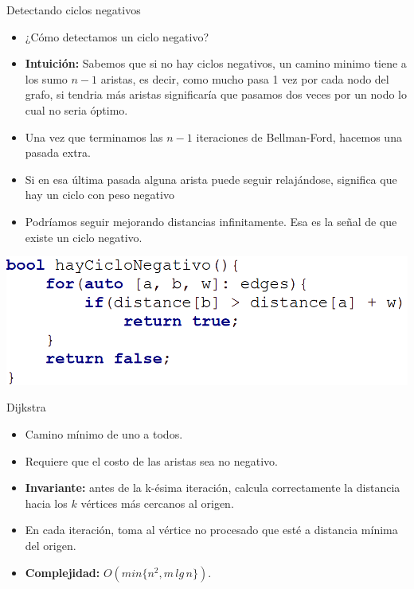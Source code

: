 \documentclass{beamer}
\begin{document}
\begin{frame}{Detectando ciclos negativos}
	\begin{itemize}
		\item ¿Cómo detectamos un ciclo negativo?
		
		\item \textbf{Intuición:} Sabemos que si no hay ciclos negativos, un camino minimo tiene a los sumo $n-1$ aristas, es decir, como mucho pasa 1 vez por cada nodo del grafo, si tendria más aristas significaría que pasamos dos veces por un nodo lo cual no seria óptimo.
		
		\item Una vez que terminamos las $n-1$ iteraciones de Bellman-Ford, hacemos una pasada extra.
		
		\item Si en esa última pasada alguna arista puede seguir relajándose, significa que hay un ciclo con peso negativo
		
		\item Podríamos seguir mejorando distancias infinitamente. Esa es la señal de que existe un ciclo negativo.	
	\end{itemize}
	\centering
	\includegraphics[scale=0.3]{figuras/ciclo-negativo-codigo.PNG}
\end{frame}

\begin{frame}{Dijkstra}
	\begin{itemize}
		\item Camino mínimo de uno a todos.
		\item Requiere que el costo de las aristas sea no negativo.
		\item \textbf{Invariante:} antes de la k-ésima iteración, calcula correctamente la distancia hacia los $k$ vértices más cercanos al origen.
		\item En cada iteración, toma al vértice no procesado que esté a distancia mínima del origen.
		\item \textbf{Complejidad:} $O(min\{n^2, m\, lg\, n\})$.
	\end{itemize}
\end{frame}
\end{document}
